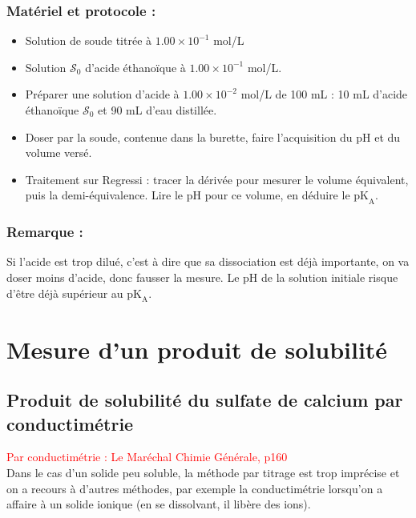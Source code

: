 \documentclass[11pt,a4paper]{report}
\begin{document}
\subsubsection{Matériel et protocole :}
\begin{itemize}
	\item Solution de soude titrée à $1.00 \times 10^{-1}$ mol/L
	\item Solution $\mathcal{S}_0$ d'acide éthanoïque à $1.00 \times 10^{-1}$ mol/L.\\
	
	\item Préparer une solution d'acide à $1.00 \times 10^{-2}$ mol/L de 100 mL : 10 mL d'acide 				éthanoïque $\mathcal{S}_0$ et 90 mL d'eau distillée.
	\item Doser par la soude, contenue dans la burette, 
		faire l'acquisition du pH et du volume versé.
	\item Traitement sur Regressi : tracer la dérivée pour mesurer le volume équivalent, puis la 				demi-équivalence. Lire le pH pour ce volume, en déduire le $\text{pK}_\text{A}$.
\end{itemize}

\subsubsection{Remarque :}
Si l'acide est trop dilué, c'est à dire que sa dissociation est déjà importante, on va doser moins d'acide, donc fausser la mesure. Le pH de la solution initiale risque d'être déjà supérieur au 
$\text{pK}_\text{A}$.

\newpage
\section{Mesure d'un produit de solubilité}\label{sec:2}

\subsection{Produit de solubilité du sulfate de calcium par conductimétrie}
\textcolor{red}{Par conductimétrie : Le Maréchal Chimie Générale, p160}\\

Dans le cas d'un solide peu soluble, la méthode par titrage est trop imprécise et on a recours à d'autres méthodes, par exemple la conductimétrie lorsqu'on a affaire à un solide ionique (en se dissolvant, il libère des ions).\\
\end{document}
